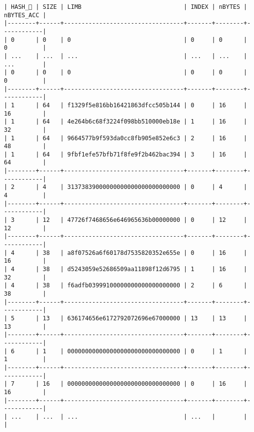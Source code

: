 \documentclass[varwidth=\maxdimen,margin=0.5cm,multi={verbatim}]{standalone}
\begin{document}
\begin{verbatim}
| HASH_ | SIZE | LIMB                             | INDEX | nBYTES | nBYTES_ACC |
|--------+------+----------------------------------+-------+--------+------------|
| 0      | 0    | 0                                | 0     | 0      | 0          |
| ...    | ...  | ...                              | ...   | ...    | ...        |
| 0      | 0    | 0                                | 0     | 0      | 0          |
|--------+------+----------------------------------+-------+--------+------------|
| 1      | 64   | f1329f5e816bb16421863dfcc505b144 | 0     | 16     | 16         |
| 1      | 64   | 4e264b6c68f3224f098bb510000eb18e | 1     | 16     | 32         |
| 1      | 64   | 9664577b9f593da0cc8fb905e852e6c3 | 2     | 16     | 48         |
| 1      | 64   | 9fbf1efe57bfb71f8fe9f2b462bac394 | 3     | 16     | 64         |
|--------+------+----------------------------------+-------+--------+------------|
| 2      | 4    | 31373839000000000000000000000000 | 0     | 4      | 4          |
|--------+------+----------------------------------+-------+--------+------------|
| 3      | 12   | 47726f7468656e646965636b00000000 | 0     | 12     | 12         |
|--------+------+----------------------------------+-------+--------+------------|
| 4      | 38   | a8f07526a6f60178d7535820352e655e | 0     | 16     | 16         |
| 4      | 38   | d5243059e52686509aa11898f12d6795 | 1     | 16     | 32         |
| 4      | 38   | f6adfb03999100000000000000000000 | 2     | 6      | 38         |
|--------+------+----------------------------------+-------+--------+------------|
| 5      | 13   | 636174656e6172792072696e67000000 | 13    | 13     | 13         |
|--------+------+----------------------------------+-------+--------+------------|
| 6      | 1    | 00000000000000000000000000000000 | 0     | 1      | 1          |
|--------+------+----------------------------------+-------+--------+------------|
| 7      | 16   | 00000000000000000000000000000000 | 0     | 16     | 16         |
|--------+------+----------------------------------+-------+--------+------------|
| ...    | ...  | ...                              | ...   |        |            |
\end{verbatim}
\end{document}
